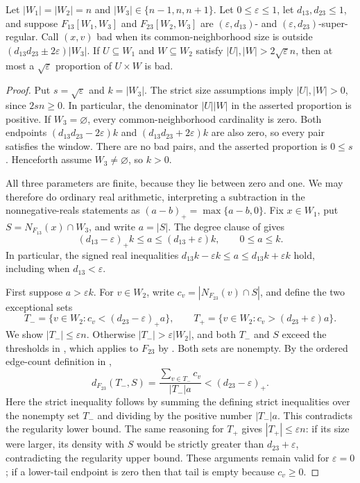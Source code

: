 \begin{lemma}
Let $|W_1|=|W_2|=n$ and $|W_3|\in\{n-1,n,n+1\}$. Let $0\leq\varepsilon\leq1$, let $d_{13},d_{23}\leq1$, and suppose $F_{13}[W_1,W_3]$ and $F_{23}[W_2,W_3]$ are $(\varepsilon,d_{13})$- and $(\varepsilon,d_{23})$-super-regular. Call $(x,v)$ bad when its common-neighborhood size is outside $(d_{13}d_{23}\pm2\varepsilon)|W_3|$. If $U\subseteq W_1$ and $W\subseteq W_2$ satisfy $|U|,|W|>2\sqrt\varepsilon n$, then at most a $\sqrt\varepsilon$ proportion of $U\times W$ is bad.
\end{lemma}
\begin{proof}
Put $s=\sqrt\varepsilon$ and $k=|W_3|$. The strict size
assumptions imply $|U|,|W|>0$, since $2sn\geq0$. In particular,
the denominator $|U||W|$ in the asserted proportion is positive.
If $W_3=\varnothing$, every common-neighborhood cardinality is zero.
Both endpoints $(d_{13}d_{23}-2\varepsilon)k$ and
$(d_{13}d_{23}+2\varepsilon)k$ are also zero, so every pair satisfies
the window. There are no bad pairs, and the asserted proportion is
$0\leq s$. Henceforth assume $W_3\ne\varnothing$, so $k>0$.

All three parameters are finite, because they lie between zero and one.
We may therefore do ordinary real arithmetic, interpreting a subtraction
in the nonnegative-reals statements as
$(a-b)_+=\max\{a-b,0\}$. Fix $x\in W_1$, put
$S=N_{F_{13}}(x)\cap W_3$, and write $a=|S|$. The degree clause of
 gives
\[
 (d_{13}-\varepsilon)_+k\leq a\leq(d_{13}+\varepsilon)k,
 \qquad 0\leq a\leq k.
\]
In particular, the signed real inequalities
$d_{13}k-\varepsilon k\leq a\leq d_{13}k+\varepsilon k$
hold, including when $d_{13}<\varepsilon$.

First suppose $a>\varepsilon k$. For $v\in W_2$, write
$c_v=|N_{F_{23}}(v)\cap S|$, and define the two exceptional sets
\[
 T_- =\{v\in W_2:c_v<(d_{23}-\varepsilon)_+a\},\qquad
 T_+ =\{v\in W_2:c_v>(d_{23}+\varepsilon)a\}.
\]
We show $|T_-|\leq\varepsilon n$. Otherwise
$|T_-|>\varepsilon|W_2|$, and both $T_-$ and $S$ exceed the
thresholds in , which applies to $F_{23}$ by
. Both sets are nonempty. By the ordered
edge-count definition in ,
\[
 d_{F_{23}}(T_-,S)
 =\frac{\sum_{v\in T_-}c_v}{|T_-|a}
 <(d_{23}-\varepsilon)_+.
\]
Here the strict inequality follows by summing the defining strict
inequalities over the nonempty set $T_-$ and dividing by the positive
number $|T_-|a$. This contradicts the regularity lower bound.
The same reasoning for $T_+$ gives $|T_+|\leq\varepsilon n$:
if its size were larger, its density with $S$ would be strictly greater
than $d_{23}+\varepsilon$, contradicting the regularity upper bound.
These arguments remain valid for $\varepsilon=0$; if a lower-tail
endpoint is zero then that tail is empty because $c_v\geq0$.


\end{proof}
